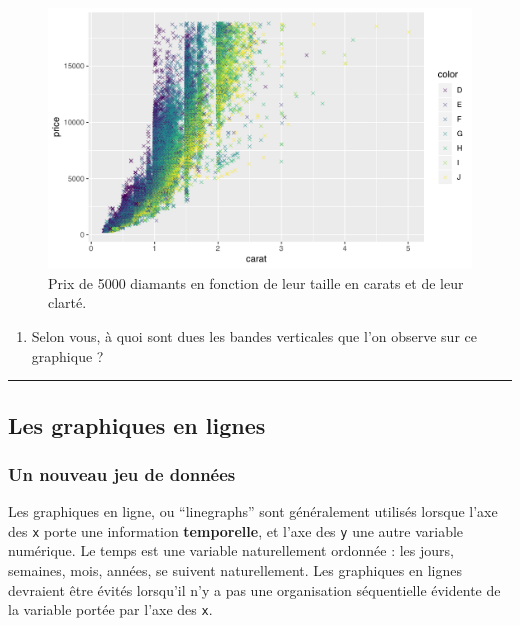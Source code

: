 \documentclass[a4paperpaper,]{article}
\providecommand{\tightlist}{%
  \setlength{\itemsep}{0pt}\setlength{\parskip}{0pt}}
\begin{document}
\begin{figure}[htpb]

{\centering \includegraphics[width=0.9\linewidth]{figure/exodiamonds-1} 

}

\caption{Prix de 5000 diamants en fonction de leur taille en carats et de leur clarté.}\label{fig:exodiamonds}
\end{figure}

\begin{enumerate}
\def\labelenumi{\arabic{enumi}.}
\setcounter{enumi}{3}
\tightlist
\item
  Selon vous, à quoi sont dues les bandes verticales que l'on observe sur ce graphique ?
\end{enumerate}

\begin{center}\rule{0.5\linewidth}{\linethickness}\end{center}

\hypertarget{les-graphiques-en-lignes}{%
\subsection{Les graphiques en lignes}\label{les-graphiques-en-lignes}}

\hypertarget{un-nouveau-jeu-de-donnees}{%
\subsubsection{Un nouveau jeu de données}\label{un-nouveau-jeu-de-donnees}}

Les graphiques en ligne, ou ``linegraphs'' sont généralement utilisés lorsque l'axe des \texttt{x} porte une information \textbf{temporelle}, et l'axe des \texttt{y} une autre variable numérique. Le temps est une variable naturellement ordonnée : les jours, semaines, mois, années, se suivent naturellement. Les graphiques en lignes devraient être évités lorsqu'il n'y a pas une organisation séquentielle évidente de la variable portée par l'axe des \texttt{x}.
\end{document}
